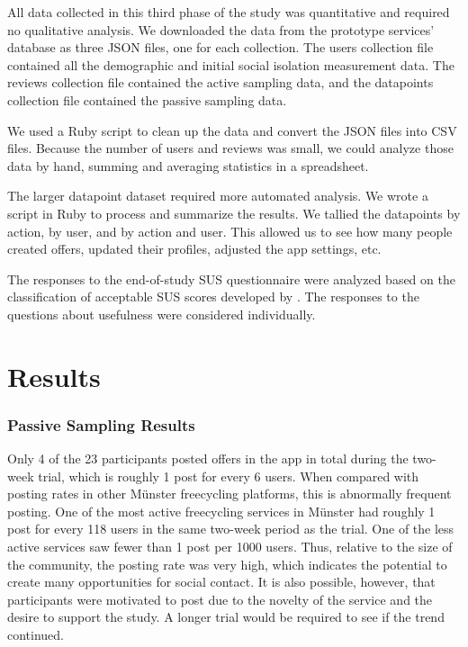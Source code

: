 All data collected in this third phase of the study was quantitative and required no qualitative analysis. We downloaded the data from the prototype services' database as three JSON files, one for each collection. The users collection file contained all the demographic and initial social isolation measurement data. The reviews collection file contained the active sampling data, and the datapoints collection file contained the passive sampling data.

We used a Ruby script to clean up the data and convert the JSON files into CSV files. Because the number of users and reviews was small, we could analyze those data by hand, summing and averaging statistics in a spreadsheet.

The larger datapoint dataset required more automated analysis. We wrote a script in Ruby to process and summarize the results. We tallied the datapoints by action, by user, and by action and user. This allowed us to see how many people created offers, updated their profiles, adjusted the app settings, etc.

The responses to the end-of-study SUS questionnaire were analyzed based on the classification of acceptable SUS scores developed by . The responses to the questions about usefulness were considered individually.


\section{Results}

\subsubsection*{Passive Sampling Results}

Only 4 of the 23 participants posted offers in the app in total during the two-week trial, which is roughly 1 post for every 6 users. When compared with posting rates in other Münster freecycling platforms, this is abnormally frequent posting. One of the most active freecycling services in Münster had roughly 1 post for every 118 users in the same two-week period as the trial. One of the less active services saw fewer than 1 post per 1000 users. Thus, relative to the size of the community, the posting rate was very high, which indicates the potential to create many opportunities for social contact. It is also possible, however, that participants were motivated to post due to the novelty of the service and the desire to support the study. A longer trial would be required to see if the trend continued.

